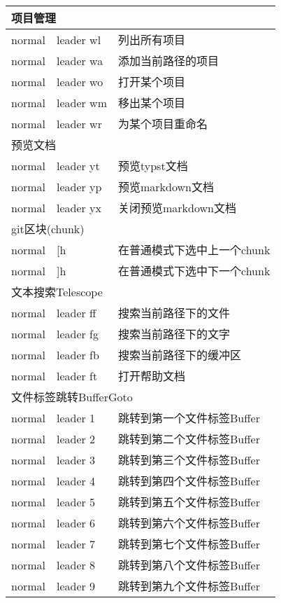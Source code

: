 \documentclass[11pt]{article}
\begin{document}
\begin{left}
  \begin{tabular}{|c|l|l|}
    \hline \multicolumn{3}{|l|}{项目管理} \\ \hline                        
    normal & leader wl & 列出所有项目 \\
    normal & leader wa & 添加当前路径的项目 \\
    normal & leader wo & 打开某个项目 \\
    normal & leader wm & 移出某个项目 \\
    normal & leader wr & 为某个项目重命名 \\
    \hline \multicolumn{3}{|l|}{预览文档} \\ \hline
    normal & leader yt & 预览typst文档 \\    
    normal & leader yp & 预览markdown文档 \\
    normal & leader yx & 关闭预览markdown文档 \\
    \hline \multicolumn{3}{|l|}{git区块(chunk)} \\ \hline
    normal & [h & 在普通模式下选中上一个chunk \\
    normal & ]h & 在普通模式下选中下一个chunk \\
    \hline \multicolumn{3}{|l|}{文本搜索Telescope} \\ \hline
    normal & leader ff & 搜索当前路径下的文件 \\
    normal & leader fg & 搜索当前路径下的文字 \\
    normal & leader fb & 搜索当前路径下的缓冲区 \\
    normal & leader ft & 打开帮助文档 \\
    \hline \multicolumn{3}{|l|}{文件标签跳转BufferGoto} \\ \hline
    normal & leader 1 & 跳转到第一个文件标签Buffer \\
    normal & leader 2 & 跳转到第二个文件标签Buffer \\
    normal & leader 3 & 跳转到第三个文件标签Buffer \\
    normal & leader 4 & 跳转到第四个文件标签Buffer \\
    normal & leader 5 & 跳转到第五个文件标签Buffer \\
    normal & leader 6 & 跳转到第六个文件标签Buffer \\
    normal & leader 7 & 跳转到第七个文件标签Buffer \\
    normal & leader 8 & 跳转到第八个文件标签Buffer \\
    normal & leader 9 & 跳转到第九个文件标签Buffer \\

\end{tabular}
\end{left}
\end{document}
